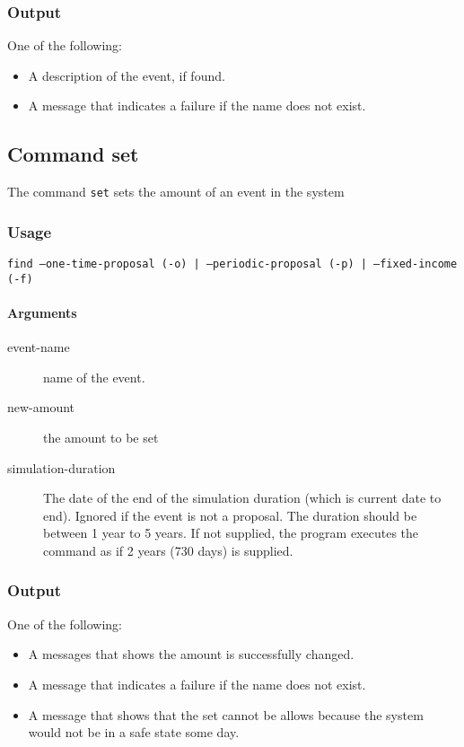 \subsubsection{Output}
One of the following:
\begin{itemize}
	\item A description of the event, if found.
	\item A message that indicates a failure if the name does not exist.
\end{itemize}

\subsection{Command set}
The command \texttt{set} sets the amount of an event in the system
\subsubsection{Usage}
\begin{center}
	\texttt{find --one-time-proposal (-o) | --periodic-proposal (-p) | --fixed-income (-f)}    
\end{center}

\paragraph{Arguments}
\begin{description}
	\item[event-name] name of the event.
	\item[new-amount] the amount to be set
	\item[simulation-duration] The date of the end of the simulation duration (which is current date to end). Ignored if the event is not a proposal. The duration should be between 1 year to 5 years. If not supplied, the program executes the command as if 2 years (730 days) is supplied.
\end{description}

\subsubsection{Output}
One of the following:
\begin{itemize}
	\item A messages that shows the amount is successfully changed.
	\item A message that indicates a failure if the name does not exist.
	\item A message that shows that the set cannot be allows because the system would not be in a safe state some day.
\end{itemize}

